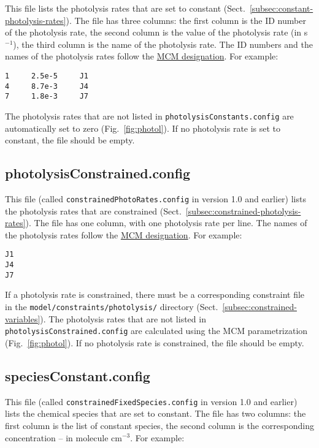 This file lists the photolysis rates that are set to constant
(Sect.~\ref{subsec:constant-photolysis-rates}). The file has three
columns: the first column is the ID number of the photolysis rate, the
second column is the value of the photolysis rate (in s$^{-1}$), the
third column is the name of the photolysis rate. The ID numbers and
the names of the photolysis rates follow the
\href{http://mcm.leeds.ac.uk/MCM/parameters/photolysis.htt}{MCM designation}.
For example:

\begin{verbatim}
1     2.5e-5     J1
4     8.7e-3     J4
7     1.8e-3     J7
\end{verbatim}

The photolysis rates that are not listed in
\texttt{photolysisConstants.config} are automatically set to zero
(Fig.~\ref{fig:photol}). If no photolysis rate is set to constant, the
file should be empty.

\subsection{photolysisConstrained.config} \label{subsec:photolysisconstrained}

This file (called \texttt{constrainedPhotoRates.config} in version 1.0
and earlier) lists the photolysis rates that are constrained
(Sect.~\ref{subsec:constrained-photolysis-rates}). The file has one column, with
one photolysis rate per line. The names of the photolysis rates follow the
\href{http://mcm.leeds.ac.uk/MCM/parameters/photolysis.htt}{MCM designation}.
For example:

\begin{verbatim}
J1
J4
J7
\end{verbatim}

If a photolysis rate is constrained, there must be a corresponding
constraint file in the \texttt{model/constraints/photolysis/}
directory (Sect.~\ref{subsec:constrained-variables}). The photolysis
rates that are not listed in \texttt{photolysisConstrained.config} are
calculated using the MCM parametrization (Fig.~\ref{fig:photol}). If
no photolysis rate is constrained, the file should be empty.

\subsection{speciesConstant.config} \label{subsec:speciesconstant}

This file (called \texttt{constrainedFixedSpecies.config} in version
1.0 and earlier) lists the chemical species that are set to
constant. The file has two columns: the first column is the list of
constant species, the second column is the corresponding concentration
-- in molecule cm$^{-3}$. For example:

